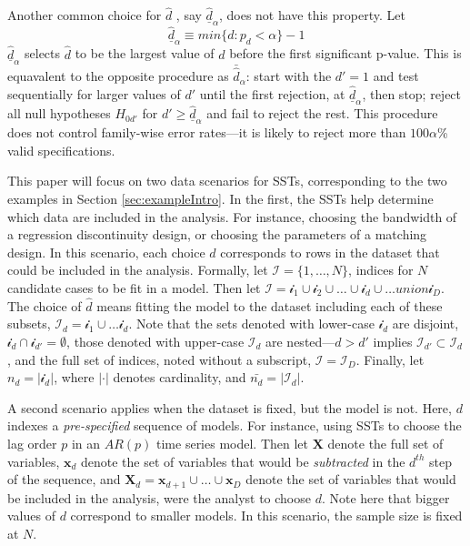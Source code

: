 \documentclass[12pt]{article}\usepackage[]{graphicx}\usepackage[]{color}
\newcommand{\dalphaU}{\bar{\hat{d}}_\alpha}
\newcommand{\dalphaB}{\underline{\hat{d}}_\alpha}
\begin{document}
Another common choice for $\hat{d}$  \citep[e.g.][]{lutkepohl2005new}, say $\dalphaB$,
does not have this property.
Let
\begin{equation}
\dalphaB\equiv min\{d: p_d<\alpha\}-1
\end{equation}
$\dalphaB$ selects $\hat{d}$ to be the largest value of $d$ before the first
significant p-value.
This is equavalent to the opposite procedure as $\dalphaU$: start with the $d'=1$
and test sequentially for larger values of $d'$ until the first
rejection, at $\dalphaB$, then stop; reject all null
hypotheses $H_{0d'}$ for $d'\ge \dalphaB$ and fail to
reject the rest.
This procedure does not control family-wise error rates---it is likely
to reject more than $100\alpha$\% valid specifications.

This paper will focus on two data scenarios for SSTs, corresponding to
the two examples in Section \ref{sec:exampleIntro}.
In the first, the SSTs help determine which data are included in the
analysis.
For instance, choosing the bandwidth of a regression discontinuity
design, or choosing the parameters of a matching design.
In this scenario, each choice $d$ corresponds to rows in the dataset
that could be included in the analysis.
Formally, let $\mathcal{I}=\{1,\dots,N\}$, indices for $N$ candidate
cases to be fit in a model.
Then let $\mathcal{I}=\mathcal{i}_1\cup\mathcal{i}_2\cup\dots\cup
\mathcal{i}_d \cup \dots union \mathcal{i}_D$.
The choice of $\hat{d}$ means fitting the model to the dataset
including each of these subsets,
$\mathcal{I}_d=\mathcal{i}_1\cup\dots\mathcal{i}_d$.
Note that the sets denoted with lower-case $\mathcal{i}_d$ are disjoint,
$\mathcal{i}_d \cap \mathcal{i}_{d'}=\emptyset$,
those denoted with upper-case $\mathcal{I}_d$ are nested---$d>d'$
implies $\mathcal{I}_{d'}\subset \mathcal{I}_d$, and the full set of
indices, noted without a subscript, $\mathcal{I}=\mathcal{I}_D$.
Finally, let $n_d=|\mathcal{i}_d|$, where $|\cdot |$ denotes
cardinality, and $\bar{n_d}=|\mathcal{I}_d |$.

A second scenario applies when the dataset is fixed, but the model is
not.
Here, $d$ indexes a \emph{pre-specified} sequence of models.
For instance, using SSTs to choose the lag order $p$ in an $AR(p)$
time series model.
Then let $\bm{X}$ denote the full set of variables, $\bm{x}_d$ denote
the set of variables that would be \emph{subtracted} in the $d^{th}$ step
of the sequence, and $\bm{X}_d=\bm{x}_{d+1} \cup \dots \cup \bm{x}_D$
denote the set of variables that would be included in the analysis,
were the analyst to choose $d$.
Note here that bigger values of $d$ correspond to smaller models.
In this scenario, the sample size is fixed at $N$.
\end{document}

